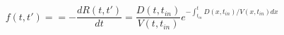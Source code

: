 \begin{equation}
f(t,t') = = -\frac{dR(t,t')}{dt} = \frac{D(t,t_{in})}{V(t,t_{in})}e^{-\int_{t_{in}}^t D(x,t_{in})/V(x,t_{in}) dx}
\end{equation}